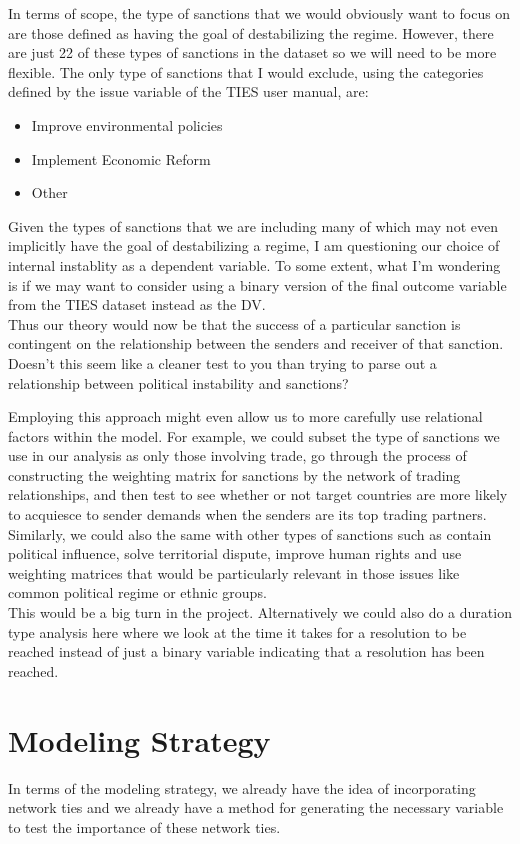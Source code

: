 In terms of scope, the type of sanctions that we would obviously want to focus on are those defined as having the goal of destabilizing the regime. However, there are just 22 of these types of sanctions in the dataset so we will need to be more flexible. The only type of sanctions that I would exclude, using the categories defined by the issue variable of the TIES user manual, are:

\begin{itemize}
	\item Improve environmental policies
	\item Implement Economic Reform
	\item Other
\end{itemize}

Given the types of sanctions that we are including many of which may not even implicitly have the goal of destabilizing a regime, I am questioning our choice of internal instablity as a dependent variable. To some extent, what I'm wondering is if we may want to consider using a binary version of the final outcome variable from the TIES dataset instead as the DV. \\

Thus our theory would now be that the success of a particular sanction is contingent on the relationship between the senders and receiver of that sanction. Doesn't this seem like a cleaner test to you than trying to parse out a relationship between political instability and sanctions?

Employing this approach might even allow us to more carefully use relational factors within the model. For example, we could subset the type of sanctions we use in our analysis as only those involving trade, go through the process of constructing the weighting matrix for sanctions by the network of trading relationships, and then test to see whether or not target countries are more likely to acquiesce to sender demands when the senders are its top trading partners. \\

Similarly, we could also the same with other types of sanctions such as contain political influence, solve territorial dispute, improve human rights and use weighting matrices that would be particularly relevant in those issues like common political regime or ethnic groups. \\

This would be a big turn in the project. Alternatively we could also do a duration type analysis here where we look at the time it takes for a resolution to be reached instead of just a binary variable indicating that a resolution has been reached.

\section*{Modeling Strategy}

In terms of the modeling strategy, we already have the idea of incorporating network ties and we already have a method for generating the necessary variable to test the importance of these network ties. 